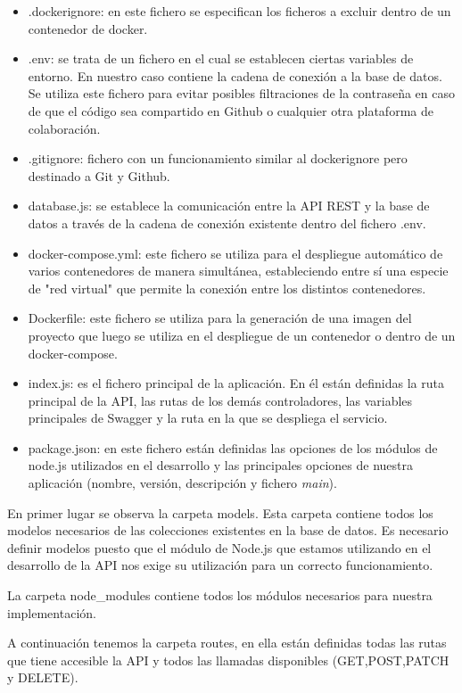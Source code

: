 \begin{itemize}
    \item .dockerignore: en este fichero se especifican los ficheros a excluir dentro de un contenedor de docker.
    \item .env: se trata de un fichero en el cual se establecen ciertas variables de entorno. En nuestro caso contiene la cadena de conexión a la base de datos. Se utiliza este fichero para evitar posibles filtraciones de la contraseña en caso de que el código sea compartido en Github o cualquier otra plataforma de colaboración.
    \item .gitignore: fichero con un funcionamiento similar al dockerignore pero destinado a Git y Github.
    \item database.js: se establece la comunicación entre la API REST y la base de datos a través de la cadena de conexión existente dentro del fichero .env.
    \item docker-compose.yml: este fichero se utiliza para el despliegue automático de varios contenedores de manera simultánea, estableciendo entre sí una especie de "red virtual" que permite la conexión entre los distintos contenedores.
    \item Dockerfile: este fichero se utiliza para la generación de una imagen del proyecto que luego se utiliza en el despliegue de un contenedor o dentro de un docker-compose.
    \item index.js: es el fichero principal de la aplicación. En él están definidas la ruta principal de la API, las rutas de los demás controladores, las variables principales de Swagger y la ruta en la que se despliega el servicio.  
    \item package.json: en este fichero están definidas las opciones de los módulos de node.js utilizados en el desarrollo y las principales opciones de nuestra aplicación (nombre, versión, descripción y fichero \textit{main}).
\end{itemize}

En primer lugar se observa la carpeta models. Esta carpeta contiene todos los modelos necesarios de las colecciones existentes en la base de datos. Es necesario definir modelos puesto que el módulo de Node.js que estamos utilizando en el desarrollo de la API nos exige su utilización para un correcto funcionamiento. 

La carpeta node\_modules contiene todos los módulos necesarios para nuestra implementación.

A continuación tenemos la carpeta routes, en ella están definidas todas las rutas que tiene accesible la API y todos las llamadas disponibles (GET,POST,PATCH y DELETE).

